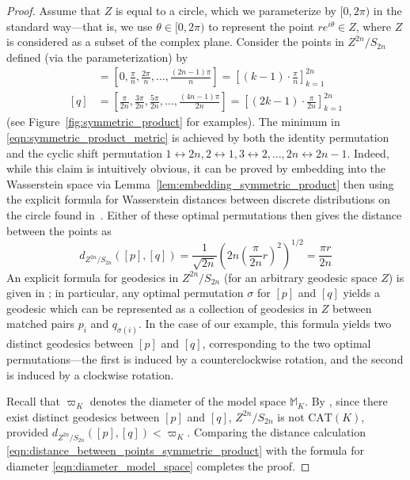 \documentclass{article}
\theoremstyle{definition}
\begin{document}
\begin{proof}
        Assume that $Z$ is equal to a circle, which we  parameterize by $[0,2\pi)$ in the standard way---that is, we use $\theta \in [0,2\pi)$ to represent the point $r e^{i \theta} \in Z$, where $Z$ is considered as a subset of the complex plane. Consider the points in $Z^{2n}/S_{2n}$ defined (via the parameterization) by 
        \begin{align*}
        [p] &= \left[0, \frac{\pi}{n}, \frac{2\pi}{n}, \ldots, \frac{(2n-1)\pi}{n}\right] = \left[(k-1) \cdot \frac{\pi}{n} \right]_{k=1}^{2n} \\
        [q] &= \left[\frac{\pi}{2n},\frac{3\pi}{2n}, \frac{5\pi}{2n},\ldots, \frac{(4n-1) \pi}{2n}\right] = \left[(2k-1)\cdot \frac{\pi}{2n} \right]_{k=1}^{2n}
        \end{align*}
     (see Figure~\ref{fig:symmetric_product} for examples). The minimum in \eqref{eqn:symmetric_product_metric} is achieved by both the identity permutation and the cyclic shift permutation $1 \leftrightarrow 2n, 2 \leftrightarrow 1, 3 \leftrightarrow 2, \ldots, 2n \leftrightarrow 2n-1$. Indeed, while this claim is intuitively obvious, it can be proved by embedding into the Wasserstein space via Lemma~\ref{lem:embedding_symmetric_product} then using the explicit formula for Wasserstein distances between discrete distributions on the circle found in~\cite[Theorem 1]{rabin2011transportation}. Either of these optimal permutations then gives the distance between the points as 
     \begin{equation}\label{eqn:distance_between_points_symmetric_product}
     d_{Z^{2n}/S_{2n}}([p],[q]) = \frac{1}{\sqrt{2n}} \left(2n \left(\frac{\pi}{2n} r\right)^2\right)^{1/2} =  \frac{\pi r}{2n}
     \end{equation}
     An explicit formula for geodesics in $Z^{2n}/S_{2n}$ (for an arbitrary geodesic space $Z$) is given in \cite[Proposition 20]{needham2023geometric}; in particular, any optimal permutation $\sigma$ for $[p]$ and $[q]$ yields a geodesic which can be represented as a collection of geodesics in $Z$  between matched pairs $p_i$ and $q_{\sigma(i)}$. In the case of our example, this formula yields two distinct geodesics between $[p]$ and $[q]$, corresponding to the two optimal permutations---the first is induced by a counterclockwise rotation, and the second is induced by a clockwise rotation.

     Recall that $\varpi_K$ denotes the diameter of the model space $\mathbb{M}_K$. By \cite[Proposition 9.8]{alexander2024alexandrov}, since there exist distinct geodesics between $[p]$ and $[q]$, $Z^{2n}/S_{2n}$ is not $\mathrm{CAT}(K)$, provided $d_{Z^{2n}/S_{2n}}([p],[q]) < \varpi_K$. Comparing the distance calculation \eqref{eqn:distance_between_points_symmetric_product} with the formula for diameter \eqref{eqn:diameter_model_space} completes the proof.  
     
\end{proof}
\end{document}
